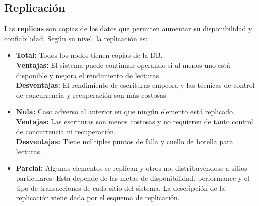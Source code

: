 \subsection*{Replicación}
Las \textbf{replicas} son copias de los datos que permiten aumentar su disponibilidad y confiabilidad. Según su nivel, la replicación es:
\begin{itemize}
    \item \textbf{Total:} Todos los nodos tienen copias de la DB. \\
    \textbf{Ventajas:} El sistema puede continuar operando si al menos uno está disponible y mejora el rendimiento de lecturas. \\
    \textbf{Desventajas:} El rendimiento de escrituras empeora y las técnicas de control de concurrencia y recuperación son más costosas.
    \item \textbf{Nula:} Caso adverso al anterior en que ningún elemento está replicado. \\
    \textbf{Ventajas:} Las escrituras son menos costosas y no requieren de tanto control de concurrencia ni recuperación. \\
    \textbf{Desventajas:} Tiene múltiples puntos de falla y cuello de botella para lecturas.
    \item \textbf{Parcial:} Algunos elementos se replican y otros no, distribuyéndose a sitios particulares. Esta depende de las metas de disponibilidad, performance y el tipo de transacciones de cada sitio del sistema. La descripción de la replicación viene dada por el esquema de replicación.
\end{itemize}

